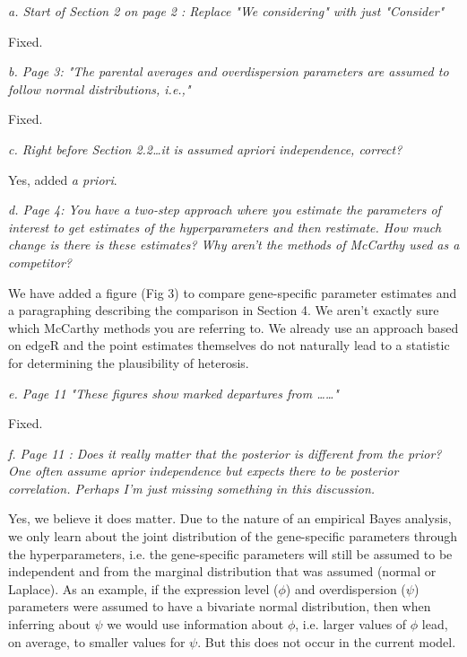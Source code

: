 \documentclass{article}
\newcommand{\comment}[1]{\textit{#1}}
\newcommand{\response}[1]{#1}
\begin{document}
\comment{a.      Start of Section 2 on page 2  :  Replace "We considering" with just "Consider"}

\response{Fixed.}

\comment{b.      Page 3: "The parental averages and overdispersion parameters are assumed to follow normal distributions, i.e.,"}

\response{Fixed.}

\comment{c.      Right before Section 2.2…it is assumed apriori independence, correct?}

\response{Yes, added \emph{a priori}.}

\comment{d.      Page 4: You have a two-step approach where you estimate the parameters of interest to get estimates of the hyperparameters and then restimate.  How much change is there is these estimates?  Why aren't the methods of McCarthy used as a competitor?}

\response{We have added a figure (Fig 3) to compare gene-specific parameter estimates and a paragraphing describing the comparison in Section 4. We aren't exactly sure which McCarthy methods you are referring to. We already use an approach based on edgeR and the point estimates themselves do not naturally lead to a statistic for determining the plausibility of heterosis.}

\comment{e.      Page 11 "These figures show marked departures from ……"}

\response{Fixed.}

\comment{f.      Page 11 : Does it really matter that the posterior is different from the prior?  One often assume aprior independence but expects there to be posterior correlation.  Perhaps I'm just missing something in this discussion.}

\response{Yes, we believe it does matter. Due to the nature of an empirical Bayes analysis, we only learn about the joint distribution of the gene-specific parameters through the hyperparameters, i.e. the gene-specific parameters will still be assumed to be independent and from the marginal distribution that was assumed (normal or Laplace). As an example, if the expression level ($\phi$) and overdispersion ($\psi$) parameters were assumed to have a bivariate normal distribution, then when inferring about $\psi$ we would use information about $\phi$, i.e. larger values of $\phi$ lead, on average, to smaller values for $\psi$. But this does not occur in the current model.}
\end{document}
